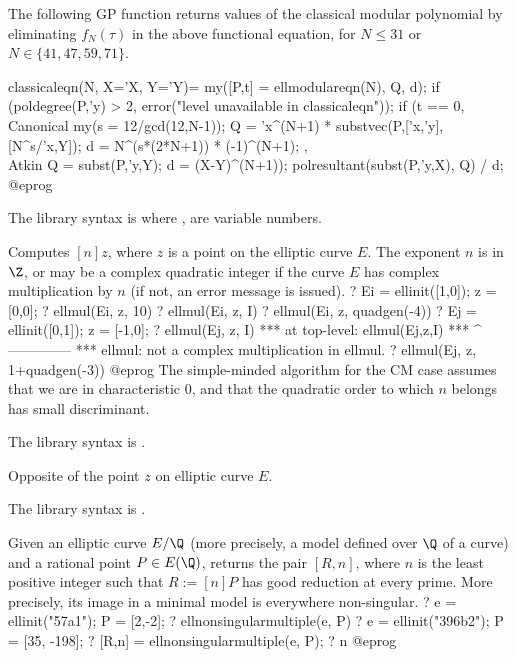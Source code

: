 The following GP function returns values of the classical modular polynomial
by eliminating $f_N(\tau)$ in the above functional equation,
for $N\leq 31$ or $N\in\{41,47,59,71\}$.

\bprog
classicaleqn(N, X='X, Y='Y)=
{
  my([P,t] = ellmodulareqn(N), Q, d);
  if (poldegree(P,'y) > 2, error("level unavailable in classicaleqn"));
  if (t == 0, \\ Canonical
    my(s = 12/gcd(12,N-1));
    Q = 'x^(N+1) * substvec(P,['x,'y],[N^s/'x,Y]);
    d = N^(s*(2*N+1)) * (-1)^(N+1);
  , \\ Atkin
    Q = subst(P,'y,Y);
    d = (X-Y)^(N+1));
  polresultant(subst(P,'y,X), Q) / d;
}
@eprog

The library syntax is  where ,  are variable numbers.

\label{se:ellmul}
Computes $[n]z$, where $z$ is a point on the elliptic curve $E$. The
exponent $n$ is in $\Z$, or may be a complex quadratic integer if the curve $E$
has complex multiplication by $n$ (if not, an error message is issued).
\bprog
? Ei = ellinit([1,0]); z = [0,0];
? ellmul(Ei, z, 10)
? ellmul(Ei, z, I)
? ellmul(Ei, z, quadgen(-4))
? Ej  = ellinit([0,1]); z = [-1,0];
? ellmul(Ej, z, I)
  ***   at top-level: ellmul(Ej,z,I)
  ***                 ^--------------
  *** ellmul: not a complex multiplication in ellmul.
? ellmul(Ej, z, 1+quadgen(-3))
@eprog
The simple-minded algorithm for the CM case assumes that we are in
characteristic $0$, and that the quadratic order to which $n$ belongs has
small discriminant.

The library syntax is .

\label{se:ellneg}
Opposite of the point $z$ on elliptic curve $E$.

The library syntax is .

\label{se:ellnonsingularmultiple}
Given an elliptic curve $E/\Q$ (more precisely, a model defined over $\Q$
of a curve) and a rational point $P \in E(\Q)$, returns the pair $[R,n]$,
where $n$ is the least positive integer such that $R := [n]P$ has good
reduction at every prime. More precisely, its image in a minimal model is
everywhere non-singular.
\bprog
? e = ellinit("57a1"); P = [2,-2];
? ellnonsingularmultiple(e, P)
? e = ellinit("396b2"); P = [35, -198];
? [R,n] = ellnonsingularmultiple(e, P);
? n
@eprog

